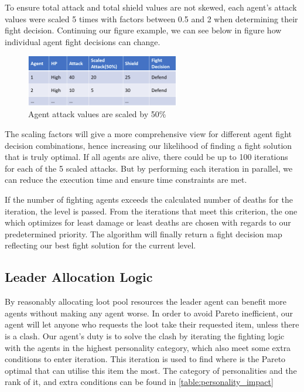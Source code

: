 To ensure total attack and total shield values are not skewed, each agent's attack values were scaled 5 times with factors between 0.5 and 2 when determining their fight decision. Continuing our figure example, we can see below in figure how individual agent fight decisions can change.
\begin{figure}[htb]
    \centering
    \includegraphics[width=0.6\textwidth]{008_team_5_agent_design/images/scaled-attack.PNG}
    \caption{Agent attack values are scaled by 50\%}
    \label{scaledattack}
\end{figure}

The scaling factors will give a more comprehensive view for different agent fight decision combinations, hence increasing our likelihood of finding a fight solution that is truly optimal. If all agents are alive, there could be up to 100 iterations for each of the 5 scaled attacks. But by performing each iteration in parallel, we can reduce the execution time and ensure time constraints are met.

If the number of fighting agents exceeds the calculated number of deaths for the iteration, the level is passed. From the iterations that meet this criterion, the one which optimizes for least damage or least deaths are chosen with regards to our predetermined priority. The algorithm will finally return a fight decision map reflecting our best fight solution for the current level.

\subsection{Leader Allocation Logic}
By reasonably allocating loot pool resources the leader agent can benefit more agents without making any agent worse. In order to avoid Pareto inefficient, our agent will let anyone who requests the loot take their requested item, unless there is a clash. Our agent's duty is to solve the clash by iterating the fighting logic with the agents in the highest personality category, which also meet some extra conditions to enter iteration. This iteration is used to find where is the Pareto optimal that can utilise this item the most. The category of personalities and the rank of it, and extra conditions can be found in \ref{table:personality_impact}

